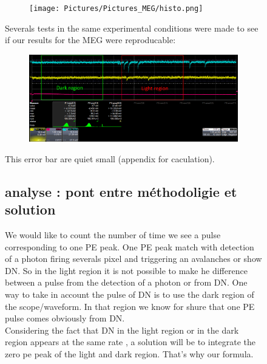 \begin{figure}[!hbtp]
  \begin{figure}[!hbtp]
  \centering
  \texttt{[image: Pictures/Pictures\_MEG/histo.png]}
  \label{fig:histo}
  \end{figure}
  
  Severals tests in the same experimental conditions were made to see if our results for the MEG were reproducable:
  
  \begin{figure}[!hbtp]
  \centering
  \includegraphics[totalheight=0.22\textwidth,trim=0cm 6.5cm 0cm 0cm, clip=true]{Pictures/blabla/light_region_3.png}
  \label{fig:dark_light_region}
  \end{figure}
  
  This error bar are quiet small (appendix for caculation). 
  
  \subsection{analyse : pont entre méthodoligie et solution }
  
  We would like to count the number of time we see a pulse corresponding to one PE peak. One PE peak match with detection of a photon firing 
  severals pixel and triggering an avalanches or show  DN. So in the light region it is not possible to make he difference between a pulse 
  from the detection of a photon or from DN. One way to take in account the pulse of DN is to use the dark region of the scope/waveform. 
  In that region we know for shure that one PE pulse comes obviously from DN.\\
  Considering the fact that DN in the light region or in the dark region appears at the same rate , a solution will be to integrate the zero pe peak of the light and dark region. That's why our formula.
  

\end{figure}
